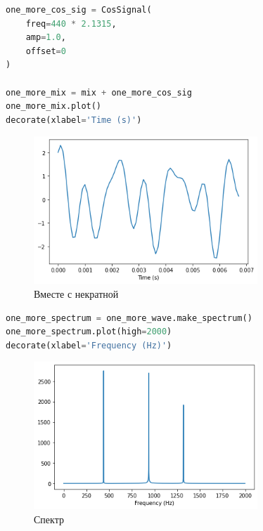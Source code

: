 \documentclass[a4paper,12pt]{report}
\begin{document}
\begin{lstlisting}[language=Python,caption=Примешиваем некратную частоту]
one_more_cos_sig = CosSignal(
    freq=440 * 2.1315,
    amp=1.0,
    offset=0
)

one_more_mix = mix + one_more_cos_sig
one_more_mix.plot()
decorate(xlabel='Time (s)')
\end{lstlisting}

    \begin{figure}[H]
        \centering
        \includegraphics[width=0.75\textwidth]{ex3_adding_non_multiple.png}
        \caption{Вместе с некратной}
        \label{fig:ex3_adding_non_multiple}
    \end{figure}
    
\begin{lstlisting}[language=Python,caption=Смотрим спектр]
one_more_spectrum = one_more_wave.make_spectrum()
one_more_spectrum.plot(high=2000)
decorate(xlabel='Frequency (Hz)')
\end{lstlisting}

    \begin{figure}[H]
        \centering
        \includegraphics[width=0.75\textwidth]{ex3_spectrum_of_non_multiples.png}
        \caption{Спектр}
        \label{fig:ex3_spectrum_of_non_multiples}
    \end{figure}
    
\end{document}
